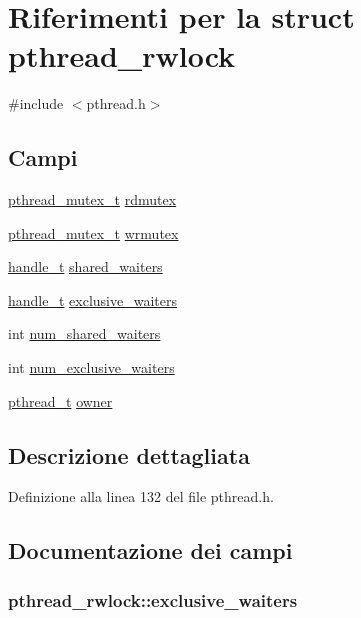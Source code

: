 \hypertarget{structpthread__rwlock}{\section{Riferimenti per la struct pthread\+\_\+rwlock}
\label{structpthread__rwlock}
}


{\ttfamily \#include $<$pthread.\+h$>$}

\subsection*{Campi}
\begin{DoxyCompactItemize}
\item 
\hyperlink{pthread_8h_ad613e9ad2d8d9713a8440618e7a70bba}{pthread\+\_\+mutex\+\_\+t} \hyperlink{structpthread__rwlock_aa525fa5ae59171418ede7d1894bf21fe}{rdmutex}
\item 
\hyperlink{pthread_8h_ad613e9ad2d8d9713a8440618e7a70bba}{pthread\+\_\+mutex\+\_\+t} \hyperlink{structpthread__rwlock_acebaf123f0d451e8aa6e7734c6bcca5b}{wrmutex}
\item 
\hyperlink{pthread_8h_aea4188cfb1472f9bb606fd2566133e34}{handle\+\_\+t} \hyperlink{structpthread__rwlock_a513e968cb2dea01c044a3304c26b1d07}{shared\+\_\+waiters}
\item 
\hyperlink{pthread_8h_aea4188cfb1472f9bb606fd2566133e34}{handle\+\_\+t} \hyperlink{structpthread__rwlock_ae49a53d46712b0d4af191e85a622da1d}{exclusive\+\_\+waiters}
\item 
int \hyperlink{structpthread__rwlock_af637581bd0ea0328763d041937160fff}{num\+\_\+shared\+\_\+waiters}
\item 
int \hyperlink{structpthread__rwlock_a5d8b56e7998376aa9f5908a560daadb7}{num\+\_\+exclusive\+\_\+waiters}
\item 
\hyperlink{pthread_8h_a6766c2345d5c6fe6407d9f6b844e584a}{pthread\+\_\+t} \hyperlink{structpthread__rwlock_a7918a35d8e929df9c7f1fd9f12e9efcf}{owner}
\end{DoxyCompactItemize}


\subsection{Descrizione dettagliata}


Definizione alla linea 132 del file pthread.\+h.



\subsection{Documentazione dei campi}
\hypertarget{structpthread__rwlock_ae49a53d46712b0d4af191e85a622da1d}{
\subsubsection[{exclusive\+\_\+waiters}]{ pthread\+\_\+rwlock\+::exclusive\+\_\+waiters}}\label{structpthread__rwlock_ae49a53d46712b0d4af191e85a622da1d}


